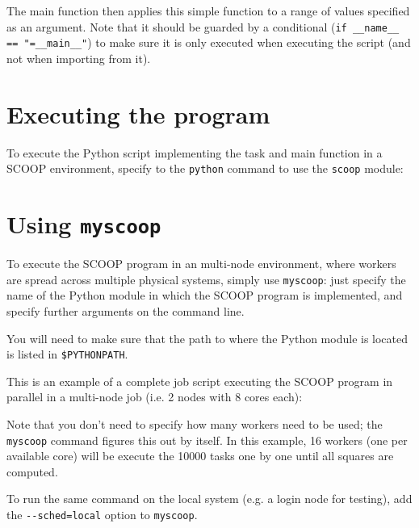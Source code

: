 The main function then applies this simple function to a range of values specified as an argument.
Note that it should be guarded by a conditional (\lstinline|if __name__ == "=__main__"|) to make sure it is only executed
when executing the script (and not when importing from it).

\section{Executing the program}

To execute the Python script implementing the task and main function in a SCOOP environment,
specify to the \lstinline|python| command to use the \lstinline|scoop| module:

\begin{prompt}
\end{prompt}


\section{Using \texttt{myscoop}}

To execute the SCOOP program in an multi-node environment, where workers are spread
across multiple physical systems, simply use \lstinline|myscoop|: just specify the
name of the Python module in which the SCOOP program is implemented, and specify
further arguments on the command line.

You will need to make sure that the path to where the Python module is located is listed in \lstinline|$PYTHONPATH|.

This is an example of a complete job script executing the SCOOP program in parallel
in a multi-node job (i.e. 2 nodes with 8 cores each):


Note that you don't need to specify how many workers need to be used; the \lstinline|myscoop|
command figures this out by itself. In this example, 16 workers (one per available core) will be
execute the 10000 tasks one by one until all squares are computed.

To run the same command on the local system (e.g. a login node for testing), add
the \lstinline|--sched=local| option to \lstinline|myscoop|.

